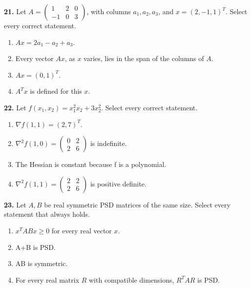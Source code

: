 \documentclass[11pt,a4paper]{article}
\begin{document}
\par\noindent\begin{minipage}{\linewidth}
\textbf{21.} Let \(A=\begin{pmatrix}1&2&0\\-1&0&3\end{pmatrix}\), with columns \(a_1,a_2,a_3\), and \(x=(2,-1,1)^T\). Select every correct statement.
\begin{enumerate}[label=(\Alph*),leftmargin=8mm,itemsep=2pt,topsep=2pt]
\item \(Ax=2a_1-a_2+a_3\).
\item Every vector \(Ax\), as \(x\) varies, lies in the span of the columns of \(A\).
\item \(Ax=(0,1)^T\).
\item \(A^Tx\) is defined for this \(x\).
\end{enumerate}

\end{minipage}\par\vspace{3mm}
\par\noindent\begin{minipage}{\linewidth}
\textbf{22.} Let \(f(x_1,x_2)=x_1^2x_2+3x_2^2\). Select every correct statement.
\begin{enumerate}[label=(\Alph*),leftmargin=8mm,itemsep=2pt,topsep=2pt]
\item \(\nabla f(1,1)=(2,7)^T\).
\item \(\nabla^2f(1,0)=\begin{pmatrix}0&2\\2&6\end{pmatrix}\) is indefinite.
\item The Hessian is constant because f is a polynomial.
\item \(\nabla^2f(1,1)=\begin{pmatrix}2&2\\2&6\end{pmatrix}\) is positive definite.
\end{enumerate}

\end{minipage}\par\vspace{3mm}
\par\noindent\begin{minipage}{\linewidth}
\textbf{23.} Let \(A,B\) be real symmetric PSD matrices of the same size. Select every statement that always holds.
\begin{enumerate}[label=(\Alph*),leftmargin=8mm,itemsep=2pt,topsep=2pt]
\item \(x^TABx\geq0\) for every real vector \(x\).
\item A+B is PSD.
\item AB is symmetric.
\item For every real matrix \(R\) with compatible dimensions, \(R^TAR\) is PSD.
\end{enumerate}

\end{minipage}\par\vspace{3mm}
\end{document}
